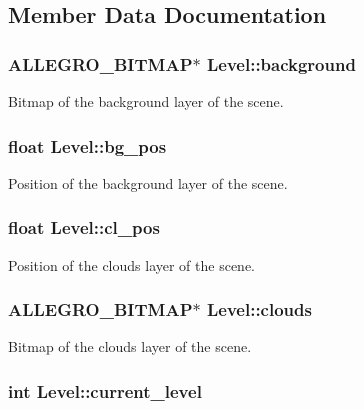 \subsection{\-Member \-Data \-Documentation}
\hypertarget{structLevel_a4b4dd31284206502977b3d5b95d52abc}{
\subsubsection[{background}]{\setlength{\rightskip}{0pt plus 5cm}\-A\-L\-L\-E\-G\-R\-O\-\_\-\-B\-I\-T\-M\-A\-P$\ast$ {\bf \-Level\-::background}}}\label{structLevel_a4b4dd31284206502977b3d5b95d52abc}
\-Bitmap of the background layer of the scene. \hypertarget{structLevel_a00321214fdc30f67615053d1ca614948}{
\subsubsection[{bg\-\_\-pos}]{\setlength{\rightskip}{0pt plus 5cm}float {\bf \-Level\-::bg\-\_\-pos}}}\label{structLevel_a00321214fdc30f67615053d1ca614948}
\-Position of the background layer of the scene. \hypertarget{structLevel_af466533be369b5ce1f48196a7f3b7b0b}{
\subsubsection[{cl\-\_\-pos}]{\setlength{\rightskip}{0pt plus 5cm}float {\bf \-Level\-::cl\-\_\-pos}}}\label{structLevel_af466533be369b5ce1f48196a7f3b7b0b}
\-Position of the clouds layer of the scene. \hypertarget{structLevel_a27d34b57b66d4e7f733cb6a5cc16ff18}{
\subsubsection[{clouds}]{\setlength{\rightskip}{0pt plus 5cm}\-A\-L\-L\-E\-G\-R\-O\-\_\-\-B\-I\-T\-M\-A\-P$\ast$ {\bf \-Level\-::clouds}}}\label{structLevel_a27d34b57b66d4e7f733cb6a5cc16ff18}
\-Bitmap of the clouds layer of the scene. \hypertarget{structLevel_a1ba3ee0104c912dde5d6e70fee889512}{
\subsubsection[{current\-\_\-level}]{\setlength{\rightskip}{0pt plus 5cm}int {\bf \-Level\-::current\-\_\-level}}}\label{structLevel_a1ba3ee0104c912dde5d6e70fee889512}
